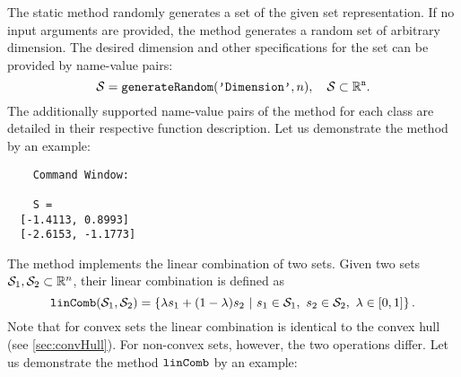 \vspace{1cm}


The static method  randomly generates a set of the given set representation. If no input arguments are provided, the method generates a random set of arbitrary dimension. The desired dimension and other specifications for the set can be provided by name-value pairs:
\begin{equation*}
	\mathcal{S} = {\normalfont \texttt{generateRandom}}(\texttt{'Dimension'},n), ~~~ \mathcal{S} \subset \mathbb{R}^{\texttt{n}}.
\end{equation*}
The additionally supported name-value pairs of the method  for each class are detailed in their respective function description. Let us demonstrate the method  by an example:

\begin{center}
\begin{minipage}[t]{0.40\textwidth}
	\vspace{10pt}
	\footnotesize
	
\end{minipage}
\begin{minipage}[t]{0.25\textwidth}
	\vspace{10pt}

	\begin{verbatim}
	Command Window:
		
	S = 
  [-1.4113, 0.8993]
  [-2.6153, -1.1773]
	\end{verbatim}
\end{minipage}
\begin{minipage}[t]{0.3\textwidth}
	\vspace{0pt}
	\centering
\end{minipage}
\end{center}

\vspace{1cm}

\label{sec:linComb}

The method  implements the linear combination of two sets. Given two sets $\mathcal{S}_1,\mathcal{S}_2 \subset \mathbb{R}^n$, their linear combination is defined as 
\begin{equation*}
	{\normalfont \texttt{linComb}}(\mathcal{S}_1,\mathcal{S}_2) = \left \{ \lambda s_1 + (1-\lambda) s_2 ~|~ s_1 \in \mathcal{S}_1,~s_2 \in \mathcal{S}_2,~\lambda \in [0,1] \right\}.
\end{equation*}
Note that for convex sets the linear combination is identical to the convex hull (see \cref{sec:convHull}). For non-convex sets, however, the two operations differ.
Let us demonstrate the method ${\normalfont \texttt{linComb}}$ by an example:

